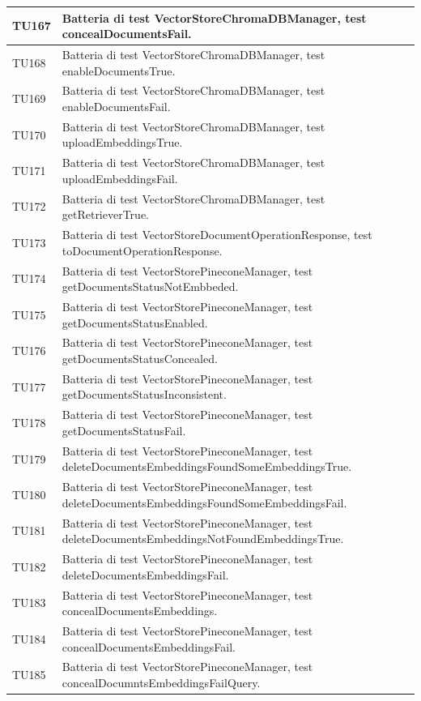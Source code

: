 \documentclass[10pt, a4paper]{article}
\begin{document}
\begin{xltabular}{\textwidth}{p{0.12\textwidth}|X}
\hline
TU167 & Batteria di test VectorStoreChromaDBManager, test concealDocumentsFail. \\
\hline
TU168 & Batteria di test VectorStoreChromaDBManager, test enableDocumentsTrue. \\
\hline
TU169 & Batteria di test VectorStoreChromaDBManager, test enableDocumentsFail. \\
\hline
TU170 & Batteria di test VectorStoreChromaDBManager, test uploadEmbeddingsTrue. \\
\hline
TU171 & Batteria di test VectorStoreChromaDBManager, test uploadEmbeddingsFail. \\
\hline
TU172 & Batteria di test VectorStoreChromaDBManager, test getRetrieverTrue. \\
\hline
TU173 & Batteria di test VectorStoreDocumentOperationResponse, test toDocumentOperationResponse. \\
\hline
TU174 & Batteria di test VectorStorePineconeManager, test getDocumentsStatusNotEmbbeded. \\
\hline
TU175 & Batteria di test VectorStorePineconeManager, test getDocumentsStatusEnabled. \\
\hline
TU176 & Batteria di test VectorStorePineconeManager, test getDocumentsStatusConcealed. \\
\hline
TU177 & Batteria di test VectorStorePineconeManager, test getDocumentsStatusInconsistent. \\
\hline
TU178 & Batteria di test VectorStorePineconeManager, test getDocumentsStatusFail. \\
\hline
TU179 & Batteria di test VectorStorePineconeManager, test deleteDocumentsEmbeddingsFoundSomeEmbeddingsTrue. \\
\hline
TU180 & Batteria di test VectorStorePineconeManager, test deleteDocumentsEmbeddingsFoundSomeEmbeddingsFail. \\
\hline
TU181 & Batteria di test VectorStorePineconeManager, test deleteDocumentsEmbeddingsNotFoundEmbeddingsTrue. \\
\hline
TU182 & Batteria di test VectorStorePineconeManager, test deleteDocumentsEmbeddingsFail. \\
\hline
TU183 & Batteria di test VectorStorePineconeManager, test concealDocumentsEmbeddings. \\
\hline
TU184 & Batteria di test VectorStorePineconeManager, test concealDocumentsEmbeddingsFail. \\
\hline
TU185 & Batteria di test VectorStorePineconeManager, test concealDocumntsEmbeddingsFailQuery. \\

\end{xltabular}
\end{document}
